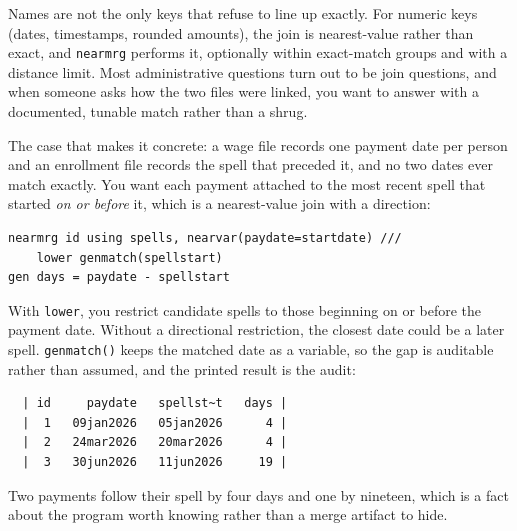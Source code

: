 Names are not the only keys that refuse to line up exactly. For numeric keys (dates, timestamps, rounded amounts), the join is nearest-value rather than exact, and \texttt{nearmrg} performs it, optionally within exact-match groups and with a distance limit. Most administrative questions turn out to be join questions, and when someone asks how the two files were linked, you want to answer with a documented, tunable match rather than a shrug.

The case that makes it concrete: a wage file records one payment date per person and an enrollment file records the spell that preceded it, and no two dates ever match exactly. You want each payment attached to the most recent spell that started \emph{on or before} it, which is a nearest-value join with a direction:
\par
{\footnotesize
\begin{verbatim}
nearmrg id using spells, nearvar(paydate=startdate) ///
    lower genmatch(spellstart)
gen days = paydate - spellstart
\end{verbatim}
}
With \texttt{lower}, you restrict candidate spells to those beginning on or before the payment date. Without a directional restriction, the closest date could be a later spell. \texttt{genmatch()} keeps the matched date as a variable, so the gap is auditable rather than assumed, and the printed result is the audit:
\par
{\footnotesize
\begin{verbatim}
  | id     paydate   spellst~t   days |
  |  1   09jan2026   05jan2026      4 |
  |  2   24mar2026   20mar2026      4 |
  |  3   30jun2026   11jun2026     19 |
\end{verbatim}
}
Two payments follow their spell by four days and one by nineteen, which is a fact about the program worth knowing rather than a merge artifact to hide.


